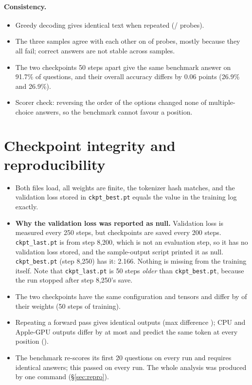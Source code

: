 \documentclass[11pt,a4paper]{article}
\begin{document}
\paragraph{Consistency.}
\begin{itemize}
\item Greedy decoding gives identical text when repeated (\ProbeSame/\ProbeN{} probes).
\item The three samples agree with each other on \ProbeAgree{} of \ProbeN{} probes, mostly because they all fail; correct answers are not stable across samples.
\item The two checkpoints 50 steps apart give the same benchmark answer on 91.7\% of questions, and their overall accuracy differs by
  0.06 points (26.9\% and 26.9\%).
\item Scorer check: reversing the order of the options changed none of \OrderN{} multiple-choice answers, so the benchmark cannot favour a position.
\end{itemize}

\section{Checkpoint integrity and reproducibility}
\begin{table}[H]\centering\small

\caption{Integrity of the two checkpoints.}
\end{table}

\begin{itemize}
\item Both files load, all weights are finite, the tokenizer hash matches, and the validation loss stored in \texttt{ckpt\_best.pt} equals the value in
  the training log exactly.
\item \textbf{Why the validation loss was reported as null.} Validation loss is measured every 250 steps, but checkpoints are saved every 200 steps.
  \texttt{ckpt\_last.pt} is from step 8,200, which is not an evaluation step, so it has no validation loss stored, and the sample-output script printed
  it as null. \texttt{ckpt\_best.pt} (step 8,250) has it: 2.166. Nothing is missing from the training itself. Note that \texttt{ckpt\_last.pt} is
  50 steps \emph{older} than \texttt{ckpt\_best.pt}, because the run stopped after step 8,250's save.
\item The two checkpoints have the same configuration and tensors and differ by \RelDiff{} of their weights (50 steps of training).
\item Repeating a forward pass gives identical outputs (max difference \RepeatDiff); CPU and Apple-GPU outputs differ by at most \CpuDiff{} and
  predict the same token at every position (\CpuArgmax).
\item The benchmark re-scores its first 20 questions on every run and requires identical answers; this passed on every run. The whole analysis
  was produced by one command (\S\ref{sec:repro}).
\end{itemize}
\end{document}
